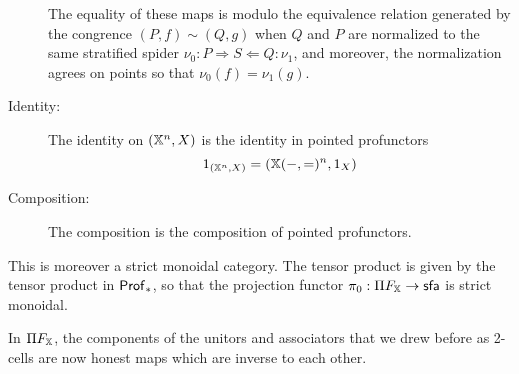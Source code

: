 \begin{lemma}
\begin{description}
The equality of these maps is modulo the equivalence relation generated by the congrence
$(P,f)\sim(Q,g)$
 when $Q$ and $P$ are normalized to the same stratified spider $\nu_0:P\Rightarrow S \Leftarrow Q:\nu_1$, and moreover, the normalization agrees on points so that $\nu_0(f)=\nu_1(g)$.
%
\item[Identity:]  The identity on $(\mathbb{X}^n,X)$ is the identity in pointed profunctors
$$
1_{(\mathbb{X}^n,X)} = (\mathbb{X}(-,=)^n,1_X)
$$
%
\item[Composition:] The composition is the composition of pointed profunctors.
\end{description}
This is moreover a strict monoidal category.  The tensor product is given by the tensor product in ${\sf Prof}_*$, so that the projection functor $\pi_0:\Pi F_{\mathbb{X}}\to {\sf sfa}$ is strict monoidal.
\end{lemma}
In $\Pi F_{\mathbb{X}}$, the components of the unitors and associators that we drew before as 2-cells are now honest maps which are inverse to each other.%
